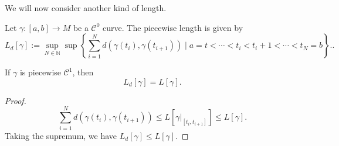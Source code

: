 We will now consider another kind of length.
\begin{definition}
    Let $\gamma: [a,b] \to M$ be a $\mathcal{C}^0$ curve. The piecewise length is given by \[
        L_d[\gamma]:=\sup_{N \in \mathbb{N}} \sup \left\{ \sum_{i=1}^N d(\gamma(t_i), \gamma(t_{i+1})) \mid a=t < \cdots < t_i <t_i+1 < \cdots < t_N=b\right\}.
    .\]  
\end{definition}
\begin{theorem}
    If $\gamma$ is piecewise $\mathcal{C}^1$, then \[
        L_d[\gamma]=L[\gamma]
    .\] 
\end{theorem}
\begin{proof}
    \[
        \sum_{i=1}^N d(\gamma(t_i),\gamma(t_{i+1})) \leq L[\gamma|_{[t_i,t_{i+1}]}] \leq L[\gamma]
    .\]  Taking the supremum, we have $L_d[\gamma]\leq L[\gamma]$.
\end{proof}
